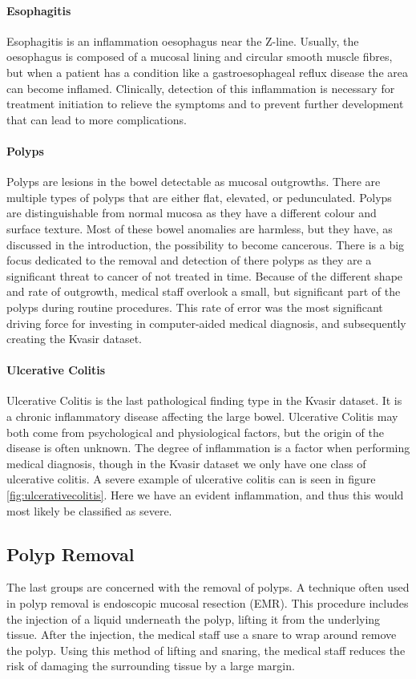\paragraph{Esophagitis}
Esophagitis is an inflammation oesophagus near the Z-line. Usually, the oesophagus is composed of a mucosal lining and circular smooth muscle fibres, but when a patient has a condition like a gastroesophageal reflux disease the area can become inflamed. 
Clinically, detection of this inflammation is necessary for treatment initiation to relieve the symptoms and to prevent further development that can lead to more complications.


\paragraph{Polyps}
Polyps are lesions in the bowel detectable as mucosal outgrowths. There are multiple types of polyps that are either flat, elevated, or pedunculated. Polyps are distinguishable from normal mucosa as they have a different colour and surface texture. Most of these bowel anomalies are harmless, but they have, as discussed in the introduction, the possibility to become cancerous. 
There is a big focus dedicated to the removal and detection of there polyps as they are a significant threat to cancer of not treated in time. Because of the different shape and rate of outgrowth, medical staff overlook a small, but significant part of the polyps during routine procedures. 
This rate of error was the most significant driving force for investing in computer-aided medical diagnosis, and subsequently creating the Kvasir dataset.

\paragraph{Ulcerative Colitis}
Ulcerative Colitis is the last pathological finding type in the Kvasir dataset. 
It is a chronic inflammatory disease affecting the large bowel. Ulcerative Colitis may both come from psychological and physiological factors, but the origin of the disease is often unknown. The degree of inflammation is a factor when performing medical diagnosis, though in the Kvasir dataset we only have one class of ulcerative colitis.
A severe example of ulcerative colitis can is seen in figure \ref{fig:ulcerativecolitis}. Here we have an evident inflammation, and thus this would most likely be classified as severe.



\subsection{Polyp Removal}
The last groups are concerned with the removal of polyps. A technique often used in polyp removal is endoscopic mucosal resection (EMR). 
This procedure includes the injection of a liquid underneath the polyp, lifting it from the underlying tissue. After the injection, the medical staff use a snare to wrap around remove the polyp. Using this method of lifting and snaring, the medical staff reduces the risk of damaging the surrounding tissue by a large margin.

